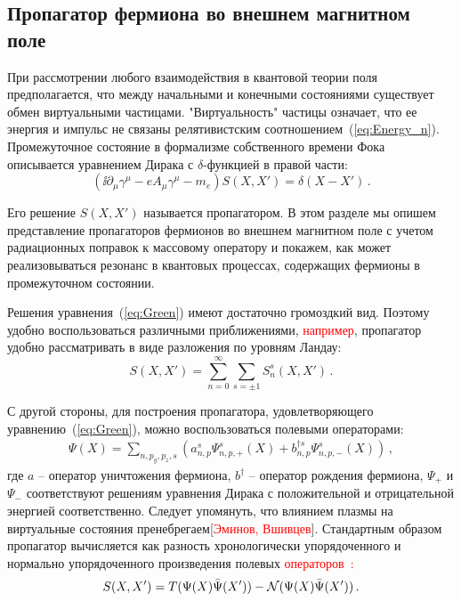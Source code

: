 \subsection{Пропагатор фермиона во внешнем магнитном поле}
При рассмотрении любого взаимодействия в квантовой теории поля предполагается, что между начальными и конечными состояниями существует обмен виртуальными частицами. "Виртуальность" частицы означает, что ее энергия и импульс не связаны релятивистским соотношением~(\ref{eq:Energy_n}). Промежуточное состояние в формализме собственного времени Фока~\cite{Schwinger:1951} описывается уравнением Дирака с $\delta$-функцией в правой части:
%
\begin{equation}\label{eq:Green}
(\ii\partial_\mu \gamma^\mu -e A_\mu \gamma^\mu - m_e) S(X,X')=\delta\left(X-X'\right)\, .
\end{equation}
%

Его решение $S(X,X')$ называется пропагатором. В этом разделе мы опишем представление пропагаторов фермионов во внешнем магнитном поле с учетом радиационных поправок к массовому оператору и покажем, как может реализовываться резонанс в квантовых процессах, содержащих фермионы в промежуточном состоянии.

Решения уравнения~(\ref{eq:Green}) имеют достаточно громоздкий вид. Поэтому удобно воспользоваться различными приближениями, \textcolor{red}{например}, пропагатор удобно рассматривать в виде разложения по уровням Ландау:
\begin{equation}
	S(X,X') = \sum_{n=0}^{\infty}\sum_{s=\pm 1} S_n^s (X,X')\, .
\end{equation}

С другой стороны, для построения пропагатора, удовлетворяющего уравнению~(\ref{eq:Green}), можно воспользоваться полевыми операторами:
%
\begin{eqnarray}
\Psi (X) = \sum\limits_{n,p_y,p_z,s} ( a^{s}_{n,p} \Psi_{n,p,+}^s (X) + b^{\dagger s}_{n,p} \Psi_{n,p,-}^s (X) )\,,
\end{eqnarray}
\noindent где $a$ -- оператор уничтожения фермиона, $b^{\dagger}$ -- оператор рождения фермиона, $\Psi_{+}$ и $\Psi_{-}$ соответствуют решениям уравнения Дирака с положительной и отрицательной энергией соответственно. Следует упомянуть, что влиянием плазмы на виртуальные состояния пренебрегаем[\textcolor{red}{Эминов, Вшивцев}]. Стандартным образом пропагатор вычисляется как разность хронологически упорядоченного и нормально упорядоченного произведения полевых \textcolor{red}{операторов~\cite{KM_Book_2013}:}
%
\begin{equation}\label{eq:SXX}
S(X,X') = T(\Psi(X)\bar{\Psi}(X')) - {\cal N}(\Psi(X)\bar{\Psi}(X'))\, .
\end{equation}
%

